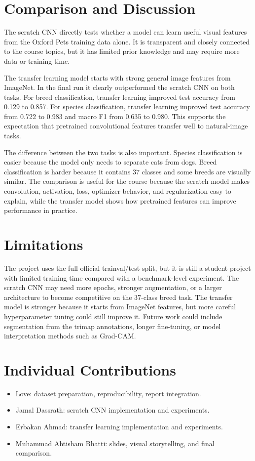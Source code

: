 \documentclass[11pt,a4paper]{article}
\begin{document}
\section{Comparison and Discussion}
The scratch CNN directly tests whether a model can learn useful visual features from the Oxford Pets training data alone. It is transparent and closely connected to the course topics, but it has limited prior knowledge and may require more data or training time.

The transfer learning model starts with strong general image features from ImageNet. In the final run it clearly outperformed the scratch CNN on both tasks. For breed classification, transfer learning improved test accuracy from 0.129 to 0.857. For species classification, transfer learning improved test accuracy from 0.722 to 0.983 and macro F1 from 0.635 to 0.980. This supports the expectation that pretrained convolutional features transfer well to natural-image tasks.

The difference between the two tasks is also important. Species classification is easier because the model only needs to separate cats from dogs. Breed classification is harder because it contains 37 classes and some breeds are visually similar. The comparison is useful for the course because the scratch model makes convolution, activation, loss, optimizer behavior, and regularization easy to explain, while the transfer model shows how pretrained features can improve performance in practice.

\clearpage
\section{Limitations}
The project uses the full official trainval/test split, but it is still a student project with limited training time compared with a benchmark-level experiment. The scratch CNN may need more epochs, stronger augmentation, or a larger architecture to become competitive on the 37-class breed task. The transfer model is stronger because it starts from ImageNet features, but more careful hyperparameter tuning could still improve it. Future work could include segmentation from the trimap annotations, longer fine-tuning, or model interpretation methods such as Grad-CAM.

\section{Individual Contributions}
\begin{itemize}
    \item Love: dataset preparation, reproducibility, report integration.
    \item Jamal Dassrath: scratch CNN implementation and experiments.
    \item Erbakan Ahmad: transfer learning implementation and experiments.
    \item Muhammad Ahtisham Bhatti: slides, visual storytelling, and final comparison.
\end{itemize}
\end{document}
